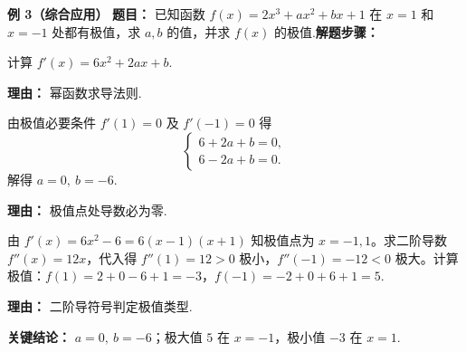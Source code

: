 \begin{examplebox}
	\medskip
	\textbf{\textcolor{CExample}{例 3（综合应用）}}
	\textbf{\textcolor{CExample}{题目：}} 已知函数 $f(x)=2x^3+ax^2+bx+1$ 在 $x=1$ 和 $x=-1$ 处都有极值，求 $a,b$ 的值，并求 $f(x)$ 的极值.\textbf{\textcolor{CExample}{解题步骤：}}
	\begin{description}[style=nextline, leftmargin=2.8em, labelsep=0.5em, itemsep=0.45em]
		\item[\textbf{第一步（求导）：}]
			计算 $f'(x)=6x^2+2ax+b$.
			\par\textbf{理由：} 幂函数求导法则.
		\item[\textbf{第二步（列方程求解）：}]
			由极值必要条件 $f'(1)=0$ 及 $f'(-1)=0$ 得
			\[
				\begin{cases}
					6+2a+b=0,\\6-2a+b=0.
			\end{cases}
			\]
			解得 $a=0,\ b=-6$.
			\par\textbf{理由：} 极值点处导数必为零.
		\item[\textbf{第三步（求极值）：}]
			由 $f'(x)=6x^2-6=6(x-1)(x+1)$ 知极值点为 $x=-1,1$。求二阶导数 $f''(x)=12x$，代入得 $f''(1)=12>0$ 极小，$f''(-1)=-12<0$ 极大。计算极值：$f(1)=2+0-6+1=-3$，$f(-1)=-2+0+6+1=5$.
			\par\textbf{理由：} 二阶导符号判定极值类型.
	\end{description}
	\textbf{\textcolor{CExample}{关键结论：}}
	$a=0,\ b=-6$；极大值 $5$ 在 $x=-1$，极小值 $-3$ 在 $x=1$.
\end{examplebox}
